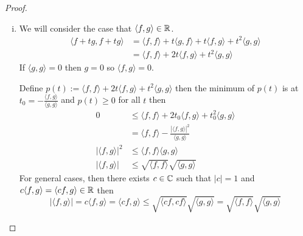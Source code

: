\begin{proof}
  \begin{enumerate}[(i)]
    \item We will consider the case that $\langle f, g\rangle \in \mathbb R$.
    \begin{align*}
      \langle f + tg, f + tg\rangle &= \langle f, f\rangle + t\langle g, f\rangle + t \langle f, g\rangle + t^2\langle g, g\rangle \\
      &= \langle f, f\rangle + 2t\langle f,g\rangle + t^2\langle g, g\rangle 
    \end{align*}
    If $\langle g, g\rangle = 0$ then $g = 0$ so $\langle f, g\rangle = 0$.

    Define $p(t) := \langle f, f\rangle + 2t\langle f, g\rangle + t^2\langle g, g\rangle$ then the minimum of $p(t)$ is at $t_0 = -\frac{\langle f, g\rangle}{\langle g, g\rangle}$
    and $p(t) \ge 0$ for all $t$ then
    \begin{align*}
      0 &\le \langle f, f\rangle + 2t_0 \langle f, g\rangle + t_0^2 \langle g, g\rangle \\
      &= \langle f, f\rangle - \frac{|\langle f, g\rangle|^2}{\langle g, g\rangle} \\
      |\langle f, g\rangle|^2 &\le \langle f, f\rangle \langle g, g\rangle \\
      |\langle f, g\rangle| &\le \sqrt{\langle f, f\rangle} \sqrt{\langle g, g\rangle}
    \end{align*}
    For general cases, then 
    there exists $c \in \mathbb C$ such that $|c|=1$ and $c\langle f, g\rangle = \langle cf, g\rangle \in \mathbb R$ then
    \[|\langle f, g \rangle| = c\langle f,g \rangle = \langle cf, g\rangle \le \sqrt{\langle cf, cf\rangle}\sqrt{\langle g, g\rangle} = \sqrt{\langle f, f\rangle}\sqrt{\langle g, g \rangle}\]


\end{enumerate}
\end{proof}
